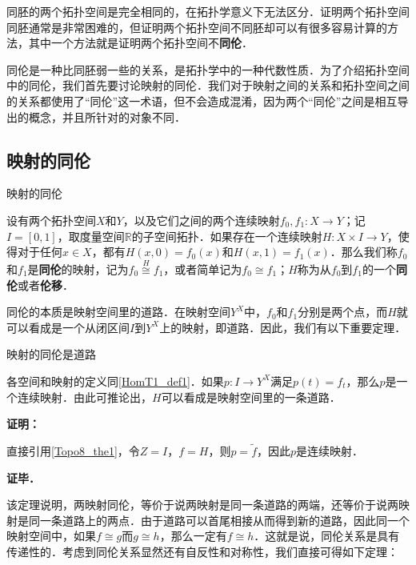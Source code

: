 
同胚的两个拓扑空间是完全相同的，在拓扑学意义下无法区分．证明两个拓扑空间同胚通常是非常困难的，但证明两个拓扑空间不同胚却可以有很多容易计算的方法，其中一个方法就是证明两个拓扑空间不\textbf{同伦}．

同伦是一种比同胚弱一些的关系，是拓扑学中的一种代数性质．为了介绍拓扑空间中的同伦，我们首先要讨论映射的同伦．我们对于映射之间的关系和拓扑空间之间的关系都使用了“同伦”这一术语，但不会造成混淆，因为两个“同伦”之间是相互导出的概念，并且所针对的对象不同．

\subsection{映射的同伦}

\begin{definition}{映射的同伦}\label{HomT1_def1}

设有两个拓扑空间$X$和$Y$，以及它们之间的两个连续映射$f_0, f_1:X\rightarrow Y$；记$I=[0, 1]$，取度量空间$\mathbb{R}$的子空间拓扑．如果存在一个连续映射$H: X\times I\rightarrow Y$，使得对于任何$x\in X$，都有$H(x, 0)=f_0(x)$和$H(x, 1)=f_1(x)$．那么我们称$f_0$和$f_1$是\textbf{同伦}的映射，记为$f_0\overset{H}{\cong} f_1$，或者简单记为$f_0\cong f_1$；$H$称为从$f_0$到$f_1$的一个\textbf{同伦}或者\textbf{伦移}．

\end{definition}

同伦的本质是映射空间里的道路．在映射空间$Y^X$中，$f_0$和$f_1$分别是两个点，而$H$就可以看成是一个从闭区间$I$到$Y^X$上的映射，即道路．因此，我们有以下重要定理．

\begin{theorem}{映射的同伦是道路}

各空间和映射的定义同\autoref{HomT1_def1}．如果$p:I\rightarrow Y^X$满足$p(t)=f_t$，那么$p$是一个连续映射．由此可推论出，$H$可以看成是映射空间里的一条道路．

\end{theorem}

\textbf{证明：}

直接引用\autoref{Topo8_the1}，令$Z=I$，$f=H$，则$p=\widetilde{f}$，因此$p$是连续映射．

\textbf{证毕．}

该定理说明，两映射同伦，等价于说两映射是同一条道路的两端，还等价于说两映射是同一条道路上的两点．由于道路可以首尾相接从而得到新的道路，因此同一个映射空间中，如果$f\cong g$而$g\cong h$，那么一定有$f\cong h$．这就是说，同伦关系是具有传递性的．考虑到同伦关系显然还有自反性和对称性，我们直接可得如下定理：

